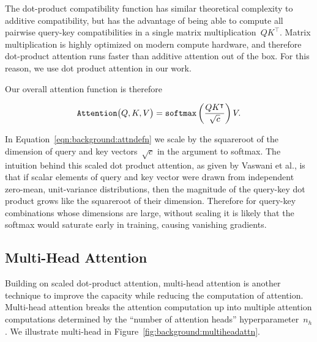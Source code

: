 The dot-product compatibility function has similar theoretical complexity to
additive compatibility, but has the advantage of being able to compute all
pairwise query-key compatibilities in a single matrix
multiplication~$QK^\intercal$.
Matrix multiplication is highly optimized on modern compute hardware, and
therefore dot-product attention runs faster than additive attention out of the
box.
For this reason, we use dot product attention in our work.

Our overall attention function is therefore

\begin{equation}
\mathtt{Attention}\big(Q, K, V\big) = \mathtt{softmax}{}\left(\frac{QK^\intercal}{\sqrt{c}}\right) V.
\label{eqn:background:attndefn}
\end{equation}

In Equation~\ref{eqn:background:attndefn} we scale by the squareroot of the
dimension of query and key vectors~$\sqrt{c}$ in the argument to softmax.
The intuition behind this scaled dot product attention, as given by Vaswani et
al., is that if scalar elements of query and key vector were drawn from
independent zero-mean, unit-variance distributions, then the magnitude of the
query-key dot product grows like the squareroot of their dimension.
Therefore for query-key combinations whose dimensions are large, without
scaling it is likely that the softmax would saturate early in training, causing
vanishing gradients.


\subsection{Multi-Head Attention}

Building on scaled dot-product attention, multi-head attention is another
technique to improve the capacity while reducing the computation of attention.
Multi-head attention breaks the attention computation up into multiple
attention computations determined by the ``number of attention heads''
hyperparameter~$n_h$.
We illustrate multi-head in Figure~\ref{fig:background:multiheadattn}.

